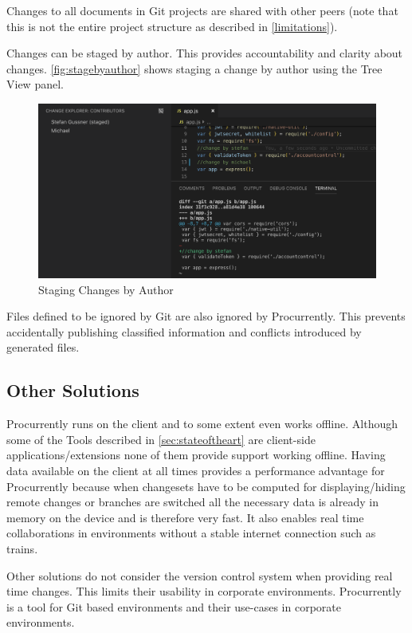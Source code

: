 Changes to all documents in Git projects are shared with other peers (note that this is not the entire project structure as described in \autoref{limitations}).

Changes can be staged by author. This provides accountability and clarity about changes. \autoref{fig:stagebyauthor} shows staging a change by author using the Tree View panel. 

\begin{figure}[hb]
    \centering
    \includegraphics[width=150mm]{figures/screenshots/stage-by-author.png}
	\caption{Staging Changes by Author}
    \label{fig:stagebyauthor}
\end{figure}

Files defined to be ignored by Git are also ignored by Procurrently. This prevents accidentally publishing classified information and conflicts introduced by generated files. 

\subsection{Other Solutions}
Procurrently runs on the client and to some extent even works offline. Although some of the Tools described in \autoref{sec:stateoftheart} are client-side applications/extensions none of them provide support working offline. Having data available on the client at all times provides a performance advantage for Procurrently because when changesets have to be computed for displaying/hiding remote changes or branches are switched all the necessary data is already in memory on the device and is therefore very fast. It also enables real time collaborations in environments without a stable internet connection such as trains.

Other solutions do not consider the version control system when providing real time changes. This limits their usability in corporate environments. Procurrently is a tool for Git based environments and their use-cases in corporate environments. 

